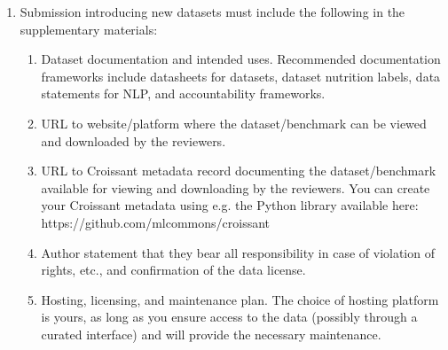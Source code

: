 
\begin{enumerate}

\item Submission introducing new datasets must include the following in the supplementary materials:
\begin{enumerate}
  \item Dataset documentation and intended uses. Recommended documentation frameworks include datasheets for datasets, dataset nutrition labels, data statements for NLP, and accountability frameworks.
  \item URL to website/platform where the dataset/benchmark can be viewed and downloaded by the reviewers.
  \item URL to Croissant metadata record documenting the dataset/benchmark available for viewing and downloading by the reviewers. You can create your Croissant metadata using e.g. the Python library available here: https://github.com/mlcommons/croissant
  \item Author statement that they bear all responsibility in case of violation of rights, etc., and confirmation of the data license.
  \item Hosting, licensing, and maintenance plan. The choice of hosting platform is yours, as long as you ensure access to the data (possibly through a curated interface) and will provide the necessary maintenance.
\end{enumerate}


\end{enumerate}
